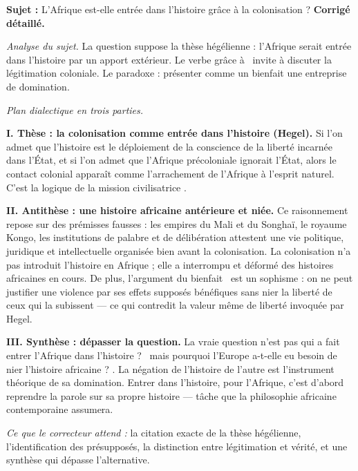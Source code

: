 \documentclass[11pt]{article}
\begin{document}
\begin{exoresolu}
\textbf{Sujet :} \guillemotleft L'Afrique est-elle entrée dans l'histoire grâce à la colonisation ? \guillemotright
\tcblower
\textbf{Corrigé détaillé.}

\emph{Analyse du sujet.} La question suppose la thèse hégélienne : l'Afrique serait entrée dans l'histoire par un apport extérieur. Le verbe \guillemotleft grâce à \guillemotright\ invite à discuter la légitimation coloniale. Le paradoxe : présenter comme un bienfait une entreprise de domination.

\emph{Plan dialectique en trois parties.}

\textbf{I. Thèse : la colonisation comme entrée dans l'histoire (Hegel).} Si l'on admet que l'histoire est le déploiement de la conscience de la liberté incarnée dans l'État, et si l'on admet que l'Afrique précoloniale ignorait l'État, alors le contact colonial apparaît comme l'arrachement de l'Afrique à l'esprit naturel. C'est la logique de la \guillemotleft mission civilisatrice \guillemotright.

\textbf{II. Antithèse : une histoire africaine antérieure et niée.} Ce raisonnement repose sur des prémisses fausses : les empires du Mali et du Songhaï, le royaume Kongo, les institutions de palabre et de délibération attestent une vie politique, juridique et intellectuelle organisée bien avant la colonisation. La colonisation n'a pas introduit l'histoire en Afrique ; elle a interrompu et déformé des histoires africaines en cours. De plus, l'argument du \guillemotleft bienfait \guillemotright\ est un sophisme : on ne peut justifier une violence par ses effets supposés bénéfiques sans nier la liberté de ceux qui la subissent — ce qui contredit la valeur même de liberté invoquée par Hegel.

\textbf{III. Synthèse : dépasser la question.} La vraie question n'est pas \guillemotleft qui a fait entrer l'Afrique dans l'histoire ? \guillemotright\ mais \guillemotleft pourquoi l'Europe a-t-elle eu besoin de nier l'histoire africaine ? \guillemotright. La négation de l'histoire de l'autre est l'instrument théorique de sa domination. Entrer dans l'histoire, pour l'Afrique, c'est d'abord reprendre la parole sur sa propre histoire — tâche que la philosophie africaine contemporaine assumera.

\emph{Ce que le correcteur attend :} la citation exacte de la thèse hégélienne, l'identification des présupposés, la distinction entre légitimation et vérité, et une synthèse qui dépasse l'alternative.
\end{exoresolu}
\end{document}
